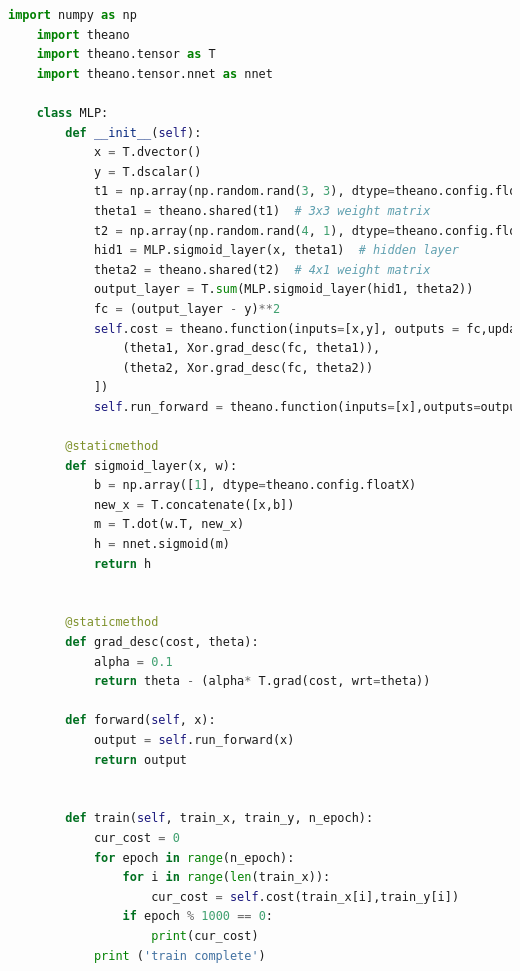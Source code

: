 \begin{lstlisting}[caption={Theano MLP},label={lst:theanomlp}, language={python}]
	import numpy as np
	import theano
	import theano.tensor as T
	import theano.tensor.nnet as nnet

	class MLP:
	    def __init__(self):
	        x = T.dvector()
	        y = T.dscalar()
	        t1 = np.array(np.random.rand(3, 3), dtype=theano.config.floatX)
	        theta1 = theano.shared(t1)  # 3x3 weight matrix
	        t2 = np.array(np.random.rand(4, 1), dtype=theano.config.floatX)
	        hid1 = MLP.sigmoid_layer(x, theta1)  # hidden layer
	        theta2 = theano.shared(t2)  # 4x1 weight matrix
	        output_layer = T.sum(MLP.sigmoid_layer(hid1, theta2))
	        fc = (output_layer - y)**2
	        self.cost = theano.function(inputs=[x,y], outputs = fc,updates=[
	            (theta1, Xor.grad_desc(fc, theta1)),
	            (theta2, Xor.grad_desc(fc, theta2))
	        ])
	        self.run_forward = theano.function(inputs=[x],outputs=output_layer)

	    @staticmethod
	    def sigmoid_layer(x, w):
	        b = np.array([1], dtype=theano.config.floatX)
	        new_x = T.concatenate([x,b])
	        m = T.dot(w.T, new_x)
	        h = nnet.sigmoid(m)
	        return h


	    @staticmethod
	    def grad_desc(cost, theta):
	        alpha = 0.1
	        return theta - (alpha* T.grad(cost, wrt=theta))

	    def forward(self, x):
	        output = self.run_forward(x)
	        return output


	    def train(self, train_x, train_y, n_epoch):
	        cur_cost = 0
	        for epoch in range(n_epoch):
	            for i in range(len(train_x)):
	                cur_cost = self.cost(train_x[i],train_y[i])
	            if epoch % 1000 == 0:
	                print(cur_cost)
	        print ('train complete')
\end{lstlisting}
